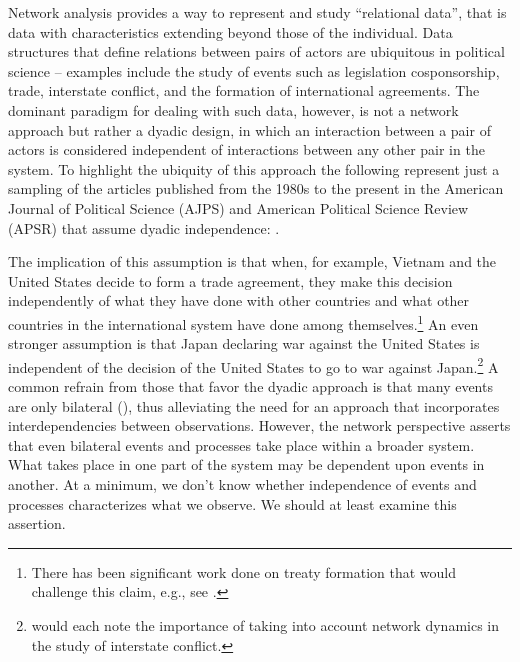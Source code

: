 \documentclass[12pt,pdflatex]{elsarticle}
\begin{document}
\newpage\setcounter{page}{1} 

Network analysis provides a way to represent and study ``relational data'', that is data with characteristics extending beyond those of the individual. Data structures that define relations between pairs of actors are ubiquitous in political science -- examples include the study of events such as legislation cosponsorship, trade, interstate conflict, and the formation of international agreements. The dominant paradigm for dealing with such data, however, is not a network approach but rather a dyadic design, in which an interaction between a pair of actors is considered independent of interactions between any other pair in the system. To highlight the ubiquity of this approach the following represent just a sampling of the articles published from the 1980s to the present in the American Journal of Political Science (AJPS) and American Political Science Review (APSR) that assume dyadic independence: \citet{dixon:1983,mansfield:etal:2000,lemke:reed:2001a,mitchell:2002,dafoe:2011a,fuhrmann:sechser:2014,carnegie:2014}.

The implication of this assumption is that when, for example, Vietnam and the United States decide to form a trade agreement, they make this decision independently of what they have done with other countries and what other countries in the international system have done among themselves.\footnote{There has been significant work done on treaty formation that would challenge this claim, e.g., see \citet{manger:etal:2012,kinne:2013}.} An even stronger assumption is that Japan declaring war against the United States is independent of the decision of the United States to go to war against Japan.\footnote{\citet{maoz:etal:2006,minhas:etal:2016} would each note the importance of taking into account network dynamics in the study of interstate conflict.} A common refrain from those that favor the dyadic approach is that many events are only bilateral (\citealt{diehl:wright:2016}), thus alleviating the need for an approach that incorporates interdependencies between observations. However, the network perspective asserts that even bilateral events and processes take place within a broader system. What takes place in one part of the system may be dependent upon events in another. At a minimum, we don't know whether independence of events and processes characterizes what we observe. We should at least examine this assertion.  

\end{document}
